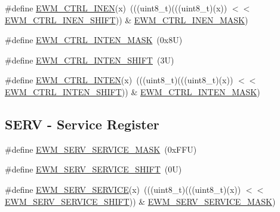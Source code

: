 \begin{DoxyCompactItemize}
\item 
\#define \mbox{\hyperlink{group___e_w_m___register___masks_ga07a59561c5e9261bd36e72c86b93ba30}{E\+W\+M\+\_\+\+C\+T\+R\+L\+\_\+\+I\+N\+EN}}(x)~(((uint8\+\_\+t)(((uint8\+\_\+t)(x)) $<$$<$ \mbox{\hyperlink{group___e_w_m___register___masks_ga64cbcf45aac428b81d2ed6aab3cd0fe2}{E\+W\+M\+\_\+\+C\+T\+R\+L\+\_\+\+I\+N\+E\+N\+\_\+\+S\+H\+I\+FT}})) \& \mbox{\hyperlink{group___e_w_m___register___masks_ga4366a1e4b346e8a61898588faa0ca7df}{E\+W\+M\+\_\+\+C\+T\+R\+L\+\_\+\+I\+N\+E\+N\+\_\+\+M\+A\+SK}})
\item 
\#define \mbox{\hyperlink{group___e_w_m___register___masks_gab5aba63161ed0c5524fff6007d84f06b}{E\+W\+M\+\_\+\+C\+T\+R\+L\+\_\+\+I\+N\+T\+E\+N\+\_\+\+M\+A\+SK}}~(0x8\+U)
\item 
\#define \mbox{\hyperlink{group___e_w_m___register___masks_gae89666da54b9dba35d0ac6e74542413d}{E\+W\+M\+\_\+\+C\+T\+R\+L\+\_\+\+I\+N\+T\+E\+N\+\_\+\+S\+H\+I\+FT}}~(3\+U)
\item 
\#define \mbox{\hyperlink{group___e_w_m___register___masks_ga0e534c5fa10e7006e9d09c61908faca4}{E\+W\+M\+\_\+\+C\+T\+R\+L\+\_\+\+I\+N\+T\+EN}}(x)~(((uint8\+\_\+t)(((uint8\+\_\+t)(x)) $<$$<$ \mbox{\hyperlink{group___e_w_m___register___masks_gae89666da54b9dba35d0ac6e74542413d}{E\+W\+M\+\_\+\+C\+T\+R\+L\+\_\+\+I\+N\+T\+E\+N\+\_\+\+S\+H\+I\+FT}})) \& \mbox{\hyperlink{group___e_w_m___register___masks_gab5aba63161ed0c5524fff6007d84f06b}{E\+W\+M\+\_\+\+C\+T\+R\+L\+\_\+\+I\+N\+T\+E\+N\+\_\+\+M\+A\+SK}})
\end{DoxyCompactItemize}
\subsection*{S\+E\+RV -\/ Service Register}
\begin{DoxyCompactItemize}
\item 
\#define \mbox{\hyperlink{group___e_w_m___register___masks_ga45e5d6d64deeb807800e044bb82f318f}{E\+W\+M\+\_\+\+S\+E\+R\+V\+\_\+\+S\+E\+R\+V\+I\+C\+E\+\_\+\+M\+A\+SK}}~(0x\+F\+F\+U)
\item 
\#define \mbox{\hyperlink{group___e_w_m___register___masks_ga4aacdb92f0d1a2edcdf651328e741c6a}{E\+W\+M\+\_\+\+S\+E\+R\+V\+\_\+\+S\+E\+R\+V\+I\+C\+E\+\_\+\+S\+H\+I\+FT}}~(0\+U)
\item 
\#define \mbox{\hyperlink{group___e_w_m___register___masks_gae68020a38e5cb5c1b85060cdfcaad1ef}{E\+W\+M\+\_\+\+S\+E\+R\+V\+\_\+\+S\+E\+R\+V\+I\+CE}}(x)~(((uint8\+\_\+t)(((uint8\+\_\+t)(x)) $<$$<$ \mbox{\hyperlink{group___e_w_m___register___masks_ga4aacdb92f0d1a2edcdf651328e741c6a}{E\+W\+M\+\_\+\+S\+E\+R\+V\+\_\+\+S\+E\+R\+V\+I\+C\+E\+\_\+\+S\+H\+I\+FT}})) \& \mbox{\hyperlink{group___e_w_m___register___masks_ga45e5d6d64deeb807800e044bb82f318f}{E\+W\+M\+\_\+\+S\+E\+R\+V\+\_\+\+S\+E\+R\+V\+I\+C\+E\+\_\+\+M\+A\+SK}})
\end{DoxyCompactItemize}
